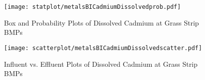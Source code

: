         \begin{figure}[hb]   %
            \centering
            \texttt{[image: statplot/metalsBICadmiumDissolvedprob.pdf]}
            \caption{Box and Probability Plots of Dissolved Cadmium at Grass Strip BMPs}
        \end{figure}         %
        
        
        \begin{figure}[hb]   %
            \centering
            \texttt{[image: scatterplot/metalsBICadmiumDissolvedscatter.pdf]}
            \caption{Influent vs. Effluent Plots of Dissolved Cadmium at Grass Strip BMPs}
        \end{figure}         %
        \clearpage
        